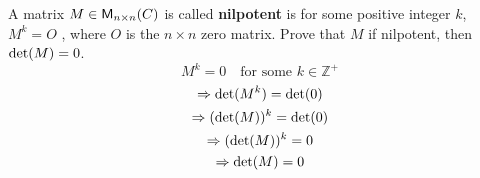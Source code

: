 A matrix $M \in \mathsf{M}_{n \times n}(C)$ is called {\bf nilpotent} is for some
positive integer $k$, $M^k= O$ , where $O$ is the $n\times n$ zero
matrix. Prove that $M$ if nilpotent, then $\text{det}({M}) = 0$.
\begin{equation}
M^k = 0 \quad \text{for some } k \in \mathbb{Z}^+
\end{equation}
\begin{gather}
\Rightarrow \text{det}({M^k}) = \text{det}({0})\\
\Rightarrow (\text{det}({M}))^k = \text{det}({0})\\
\Rightarrow (\text{det}({M}))^k = 0\\
\Rightarrow \text{det}({M}) = 0
\end{gather}
